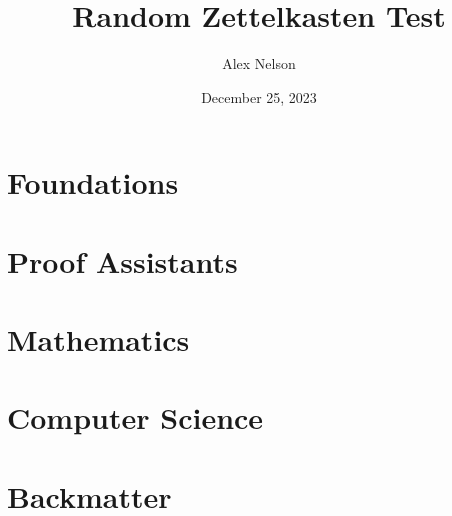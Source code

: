 \documentclass[dvipsnames,HTML]{amsbook}
\title{Random Zettelkasten Test}
\author{Alex Nelson}
\date{December 25, 2023}
\begin{document}
\frontmatter
\maketitle
\tableofcontents
\listofpuzzles

\mainmatter
\vfill\eject

\part{Foundations}










\part{Proof Assistants}









\part{Mathematics}





\part{Computer Science}



\backmatter
\part{Backmatter}
\appendix


\unappendix
\nocite{*}

\end{document}
